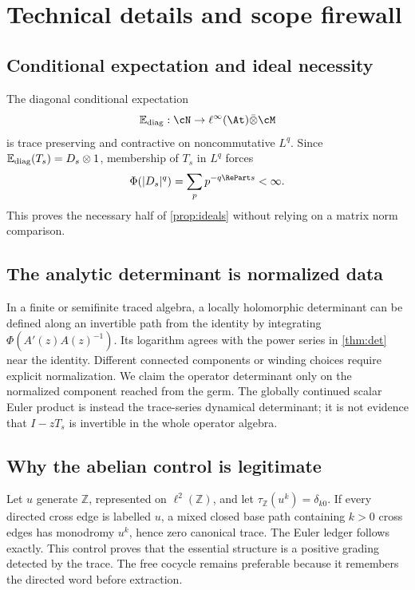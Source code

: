 \section{Technical details and scope firewall}
\label{app:proofs}

\subsection{Conditional expectation and ideal necessity}

The diagonal conditional expectation
\[
 \mathbb E_{\rm diag}:\cN\to
 \ell^\infty(\At)\bar\otimes\cM
\]
is trace preserving and contractive on noncommutative $L^q$.  Since
$\mathbb E_{\rm diag}(T_s)=D_s\otimes1$, membership of $T_s$ in $L^q$ forces
\[
 \Phi(|D_s|^q)=\sum_pp^{-q\RePart s}<\infty.
\]
This proves the necessary half of \cref{prop:ideals} without relying on a
matrix norm comparison.

\subsection{The analytic determinant is normalized data}

In a finite or semifinite traced algebra, a locally holomorphic determinant
can be defined along an invertible path from the identity by integrating
$\Phi(A'(z)A(z)^{-1})$.  Its logarithm agrees with the power series in
\cref{thm:det} near the identity.  Different connected components or winding
choices require explicit normalization.  We claim the operator determinant
only on the normalized component reached from the germ.  The globally
continued scalar Euler product is instead the trace-series dynamical
determinant; it is not evidence that $I-zT_s$ is invertible in the whole
operator algebra.

\subsection{Why the abelian control is legitimate}

Let $u$ generate $\mathbb Z$, represented on $\ell^2(\mathbb Z)$, and let
$\tau_{\mathbb Z}(u^k)=\delta_{k0}$.  If every directed cross edge is labelled
$u$, a mixed closed base path containing $k>0$ cross edges has monodromy
$u^k$, hence zero canonical trace.  The Euler ledger follows exactly.  This
control proves that the essential structure is a positive grading detected
by the trace.  The free cocycle remains preferable because it remembers the
directed word before extraction.


